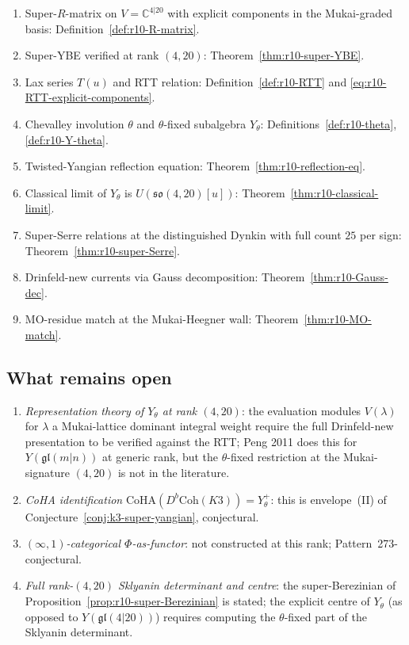 \documentclass{article}
\providecommand{\C}{\mathbb C}
\providecommand{\fgl}{\mathfrak{gl}}
\providecommand{\fso}{\mathfrak{so}}
\providecommand{\CoHA}{\mathrm{CoHA}}
\theoremstyle{definition}
\begin{document}
\begin{enumerate}[label=\textup{(\arabic*)}]
\item Super-$R$-matrix on $V = \C^{4|20}$ with explicit components
  in the Mukai-graded basis: Definition~\ref{def:r10-R-matrix}.
\item Super-YBE verified at rank $(4, 20)$:
  Theorem~\ref{thm:r10-super-YBE}.
\item Lax series $T(u)$ and RTT relation:
  Definition~\ref{def:r10-RTT} and
  \eqref{eq:r10-RTT-explicit-components}.
\item Chevalley involution $\theta$ and $\theta$-fixed subalgebra
  $Y_\theta$: Definitions~\ref{def:r10-theta}, \ref{def:r10-Y-theta}.
\item Twisted-Yangian reflection equation:
  Theorem~\ref{thm:r10-reflection-eq}.
\item Classical limit of $Y_\theta$ is $U(\fso(4, 20)[u])$:
  Theorem~\ref{thm:r10-classical-limit}.
\item Super-Serre relations at the distinguished Dynkin with full
  count $25$ per sign: Theorem~\ref{thm:r10-super-Serre}.
\item Drinfeld-new currents via Gauss decomposition:
  Theorem~\ref{thm:r10-Gauss-dec}.
\item MO-residue match at the Mukai-Heegner wall:
  Theorem~\ref{thm:r10-MO-match}.
\end{enumerate}

\subsection{What remains open}

\begin{enumerate}[label=\textup{(\arabic*)}]
\item \emph{Representation theory of $Y_\theta$ at rank $(4, 20)$}:
  the evaluation modules $V(\lambda)$ for $\lambda$ a Mukai-lattice
  dominant integral weight require the full Drinfeld-new
  presentation to be verified against the RTT; Peng 2011 does this
  for $Y(\fgl(m|n))$ at generic rank, but the $\theta$-fixed
  restriction at the Mukai-signature $(4, 20)$ is not in the
  literature.
\item \emph{CoHA identification} $\CoHA(D^b\mathrm{Coh}(K3)) =
  Y_\theta^+$: this is envelope~(II) of
  Conjecture~\ref{conj:k3-super-yangian}, conjectural.
\item \emph{$(\infty, 1)$-categorical $\Phi$-as-functor}: not
  constructed at this rank; Pattern~273-conjectural.
\item \emph{Full rank-$(4, 20)$ Sklyanin determinant and centre}:
  the super-Berezinian of Proposition~\ref{prop:r10-super-Berezinian}
  is stated; the explicit centre of $Y_\theta$ (as opposed to
  $Y(\fgl(4|20))$) requires computing the $\theta$-fixed part of
  the Sklyanin determinant.
\end{enumerate}
\end{document}
